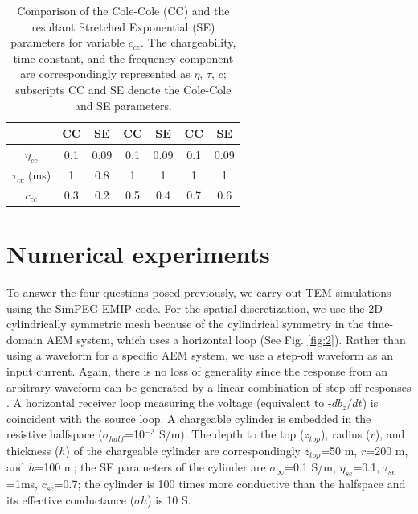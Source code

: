 \documentclass[manuscript]{geophysics}
\newcommand{\siginf}{\sigma_\infty}
\begin{document}
\begin{table}
 \centering
 \caption{Comparison of the Cole-Cole (CC) and the resultant Stretched Exponential (SE) parameters for variable $c_{cc}$. The chargeability, time constant, and the frequency component are correspondingly represented as $\eta$, $\tau$, $c$; subscripts CC and SE denote the Cole-Cole and SE parameters.}
 \begin{tabular}{@{}|c|c|c|c|c|c|c|}
    \hline
                &CC         &SE                &CC         &SE        &CC           &SE  \\
    \hline
    $\eta_{cc}$ &0.1        &0.09              &0.1        &0.09      &0.1          &0.09 \\
    $\tau_{cc}$ (ms) &1     &0.8               &1          &1         &1            &1 \\
    $c_{cc}$    &0.3        &0.2               &0.5        &0.4       &0.7          &0.6 \\
    \hline
 \end{tabular}
 \label{table: 1}
\end{table}
\clearpage

\section{Numerical experiments}
To answer the four questions posed previously, we carry out TEM simulations using the SimPEG-EMIP code. For the spatial discretization, we use the 2D cylindrically symmetric mesh because of the cylindrical symmetry in the time-domain AEM system, which uses a horizontal loop (See Fig. \ref{fig:2}). Rather than using a waveform for a specific AEM system, we use a step-off waveform as an input current. Again, there is no loss of generality since the response from an  arbitrary waveform can be generated by a linear combination of step-off responses \cite[]{fitterman1987}. A horizontal receiver loop measuring the voltage (equivalent to -$db_z/dt$) is coincident with the source loop. A chargeable cylinder is embedded in the resistive halfspace ($\sigma_{half}$=10$^{-3}$ S/m). The depth to the top ($z_{top}$), radius ($r$), and thickness ($h$) of the chargeable cylinder are correspondingly $z_{top}$=50 m, $r$=200 m, and $h$=100 m; the SE parameters of the cylinder are $\siginf$=0.1 S/m, $\eta_{se}$=0.1, $\tau_{se}$=1ms, $c_{se}$=0.7; the cylinder is 100 times more conductive than the halfspace and its effective conductance ($\sigma h$) is 10 S.
\end{document}
